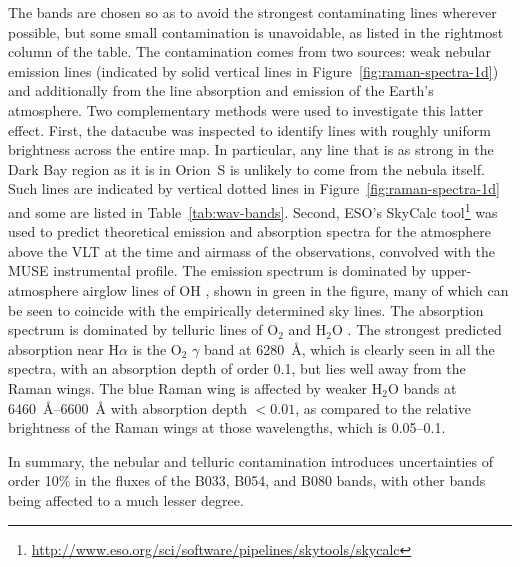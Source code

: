 \documentclass[times]{aastex63}
\newcommand*\chem[1]{\ensuremath{\mathrm{#1}}}
\newcommand\ha{\ensuremath{\text{H}\alpha}}
\begin{document}
The bands are chosen so as to avoid the strongest contaminating lines
wherever possible, but some small contamination is unavoidable, as
listed in the rightmost column of the table.  The contamination comes
from two sources: weak nebular emission lines (indicated by solid
vertical lines in Figure~\ref{fig:raman-spectra-1d}) and additionally
from the line absorption and emission of the Earth's atmosphere.  Two
complementary methods were used to investigate this latter effect.
First, the datacube was inspected to identify lines with roughly
uniform brightness across the entire map.  In particular, any line
that is as strong in the Dark Bay region as it is in Orion~S is
unlikely to come from the nebula itself.  Such lines are indicated by
vertical dotted lines in Figure~\ref{fig:raman-spectra-1d} and some
are listed in Table~\ref{tab:wav-bands}.  Second, ESO's SkyCalc
tool\footnote{\url{http://www.eso.org/sci/software/pipelines/skytools/skycalc}}
was used to predict theoretical emission and absorption spectra for
the atmosphere above the VLT at the time and airmass of the
observations, convolved with the MUSE instrumental profile.  The
emission spectrum is dominated by upper-atmosphere airglow lines of
\chem{OH} \citep{Osterbrock:1996a, Noll:2012a, Noll:2014a}, shown in
green in the figure, many of which can be seen to coincide with the
empirically determined sky lines.  The absorption spectrum is
dominated by telluric lines of \chem{O_2} and \chem{H_2 O}
\citep{Moehler:2014a, Smette:2015a}.  The strongest predicted
absorption near \ha{} is the \chem{O_2} \(\gamma\) band at
\SI{6280}{\angstrom}, which is clearly seen in all the spectra, with
an absorption depth of order \num{0.1}, but lies well away from the
Raman wings.  The blue Raman wing is affected by weaker \chem{H_2 O}
bands at \SIrange{6460}{6600}{\angstrom} with absorption depth
\(< 0.01\), as compared to the relative brightness of the Raman wings
at those wavelengths, which is \numrange{0.05}{0.1}.

In summary, the nebular and telluric contamination introduces
uncertainties of order 10\% in the fluxes of the B033, B054, and B080
bands, with other bands being affected to a much lesser degree.
\end{document}
